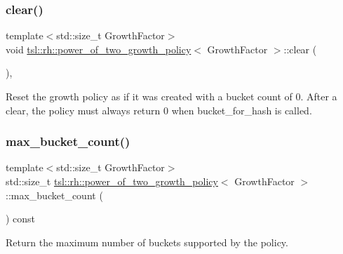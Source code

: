 \subsubsection{\texorpdfstring{clear()}{clear()}}
{\footnotesize\ttfamily template$<$std\+::size\+\_\+t Growth\+Factor$>$ \\
void \mbox{\hyperlink{classtsl_1_1rh_1_1power__of__two__growth__policy}{tsl\+::rh\+::power\+\_\+of\+\_\+two\+\_\+growth\+\_\+policy}}$<$ Growth\+Factor $>$\+::clear (\begin{DoxyParamCaption}{ }\end{DoxyParamCaption})\hspace{0.3cm}{\ttfamily [inline]}, {\ttfamily [noexcept]}}

Reset the growth policy as if it was created with a bucket count of 0. After a clear, the policy must always return 0 when bucket\+\_\+for\+\_\+hash is called. \mbox{\label{classtsl_1_1rh_1_1power__of__two__growth__policy_a837ee1d15d9f44004f8acbb5df116939}} 
\subsubsection{\texorpdfstring{max\_bucket\_count()}{max\_bucket\_count()}}
{\footnotesize\ttfamily template$<$std\+::size\+\_\+t Growth\+Factor$>$ \\
std\+::size\+\_\+t \mbox{\hyperlink{classtsl_1_1rh_1_1power__of__two__growth__policy}{tsl\+::rh\+::power\+\_\+of\+\_\+two\+\_\+growth\+\_\+policy}}$<$ Growth\+Factor $>$\+::max\+\_\+bucket\+\_\+count (\begin{DoxyParamCaption}{ }\end{DoxyParamCaption}) const\hspace{0.3cm}{\ttfamily [inline]}}

Return the maximum number of buckets supported by the policy. \mbox{\label{classtsl_1_1rh_1_1power__of__two__growth__policy_ab6ff2bc13c9a3c87cc8c90469e4191a3}} 
